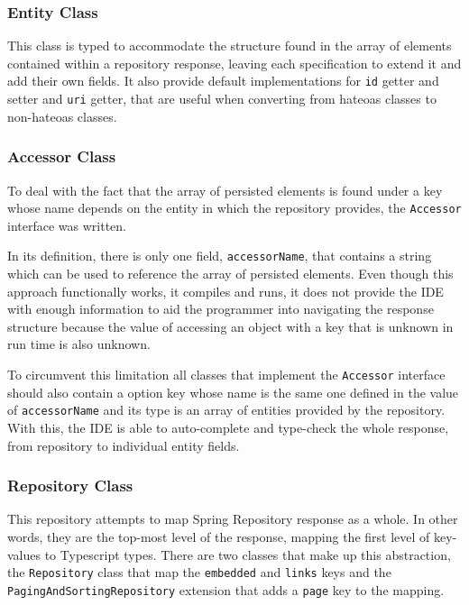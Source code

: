

\subsubsection{Entity Class}
This class is typed to accommodate the structure found in the array of elements contained within a repository response, leaving each specification to extend it and add their own fields. It also provide default implementations for \texttt{id} getter and setter and \texttt{uri} getter, that are useful when converting from hateoas classes to non-hateoas classes.

\subsubsection{Accessor Class}
To deal with the fact that the array of persisted elements is found under a key whose name depends on the entity in which the repository provides, the \texttt{Accessor} interface was written.

In its definition, there is only one field, \texttt{accessorName}, that contains a string which can be used to reference the array of persisted elements. Even though this approach functionally works, it compiles and runs, it does not provide the \gls{IDE} with enough information to aid the programmer into navigating the response structure because the value of accessing an object with a key that is unknown in run time is also unknown.

To circumvent this limitation all classes that implement the \texttt{Accessor} interface should also contain a option key whose name is the same one defined in the value of \texttt{accessorName} and its type is an array of entities provided by the repository. With this, the \gls{IDE} is able to auto-complete and type-check the whole response, from repository to individual entity fields.

\subsubsection{Repository Class}
This repository attempts to map Spring Repository response as a whole. In other words, they are the top-most level of the response, mapping the first level of key-values to Typescript types. There are two classes that make up this abstraction, the \texttt{Repository} class that map the \texttt{\textunderscore embedded} and \texttt{\textunderscore links} keys and the \texttt{PagingAndSortingRepository} extension that adds a \texttt{page} key to the mapping.

